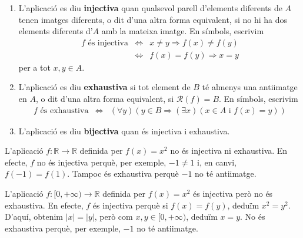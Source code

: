 \begin{enumerate}
\item L'aplicació es diu \textbf{injectiva} quan qualsevol parell
d'elements diferents de $A$ tenen imatges diferents, o dit d'una altra forma
equivalent, si no hi ha dos elements diferents d'$A$ amb la mateixa imatge.
En símbols, escrivim%
\begin{equation*}
\begin{array}{lll}
f\text{ és injectiva} & \Longleftrightarrow & x\neq y\Longrightarrow
f(x)\neq f(y) \\
& \Longleftrightarrow & f(x)=f(y)\Longrightarrow x=y%
\end{array}
\end{equation*}
per a tot $x,y\in A$.

\item L'aplicació es diu \textbf{exhaustiva} si tot element de $B$ té
almenys una antiimatge en $A$, o dit d'una altra forma equivalent, si $%
\mathcal{R}\left( f\right) =B$. En símbols, escrivim%
\begin{equation*}
\begin{array}{lll}
f\text{ és exhaustiva} & \Longleftrightarrow & \left( \forall y\right)
\left( y\in B\Longrightarrow\left( \exists x\right) \left( x\in A\text{ i }%
f(x)=y\right) \right)%
\end{array}
\end{equation*}

\item L'aplicació es diu \textbf{bijectiva} quan és injectiva i
exhaustiva.
\end{enumerate}

\begin{exemple}
L'aplicació $f:\mathbb{R}\longrightarrow\mathbb{R}$ definida per $%
f(x)=x^{2}$ no és injectiva ni exhaustiva. En efecte, $f$ no és
injectiva perquè, per exemple, $-1\neq1$ i, en canvi, $f(-1)=f(1)$.
Tampoc és exhaustiva perquè $-1$ no té antiimatge.
\end{exemple}

\begin{exemple}
L'aplicació $f:[0,+\infty)\longrightarrow\mathbb{R}$ definida per $%
f(x)=x^{2}$ és injectiva però no és exhaustiva. En efecte, $f$
és injectiva perquè si $f(x)=f(y)$, deduïm $x^{2}=y^{2}$. D'aquí, obtenim $\left\vert x\right\vert =\left\vert y\right\vert $, però
com $x,y\in[0,+\infty)$, deduïm $x=y$. No és exhaustiva perquè, per exemple, $-1$ no té antiimatge.
\end{exemple}

